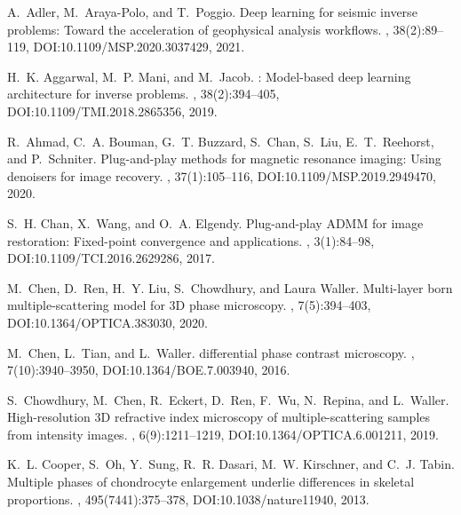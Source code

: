\documentclass[11pt]{article}
\theoremstyle{plain} %
\begin{document}
\begin{thebibliography}{10}

A.~Adler, M.~Araya-Polo, and T.~Poggio.
\newblock Deep learning for seismic inverse problems: Toward the acceleration of geophysical analysis workflows.
, 38(2):89--119, 
\newblock DOI:10.1109/MSP.2020.3037429,
2021. 

H.~K. {Aggarwal}, M.~P. {Mani}, and M.~{Jacob}.
: Model-based deep learning architecture for inverse problems.
, 38(2):394--405,
\newblock DOI:10.1109/TMI.2018.2865356,
2019.

R.~{Ahmad}, C.~A. {Bouman}, G.~T. {Buzzard}, S.~{Chan}, S.~{Liu}, E.~T.~{Reehorst}, and P.~{Schniter}.
\newblock Plug-and-play methods for magnetic resonance imaging: Using denoisers for image recovery. 
, 37(1):105--116, 
\newblock DOI:10.1109/MSP.2019.2949470,
2020.

S.~H. Chan, X.~Wang, and O.~A. Elgendy.
\newblock Plug-and-play {ADMM} for image restoration: Fixed-point convergence and applications.
, 3(1):84--98,
\newblock DOI:10.1109/TCI.2016.2629286,
2017.

M.~Chen, D.~Ren, H.~Y. Liu, S.~Chowdhury, and Laura Waller.
\newblock Multi-layer born multiple-scattering model for 3{D} phase microscopy.
, 7(5):394--403,
\newblock DOI:10.1364/OPTICA.383030,
2020.

M.~Chen, L.~Tian, and L.~Waller.
 differential phase contrast microscopy.
, 7(10):3940--3950,
\newblock DOI:10.1364/BOE.7.003940,
2016.

S.~Chowdhury, M.~Chen, R.~Eckert, D.~Ren, F.~Wu, N.~Repina, and L.~Waller.
\newblock High-resolution 3{D} refractive index microscopy of multiple-scattering samples from intensity images.
, 6(9):1211--1219,
\newblock DOI:10.1364/OPTICA.6.001211,
2019.

K.~L. Cooper, S.~Oh, Y.~Sung, R.~R. Dasari, M.~W. Kirschner, and C.~J. Tabin.
\newblock Multiple phases of chondrocyte enlargement underlie differences in skeletal proportions.
, 495(7441):375--378,
\newblock DOI:10.1038/nature11940,
2013.


\end{thebibliography}
\end{document}
